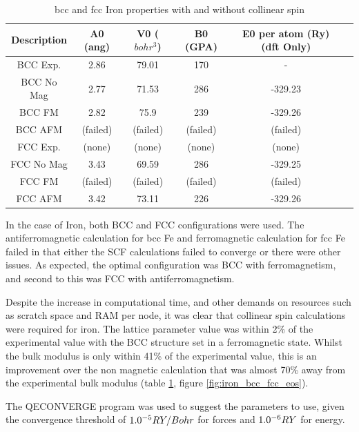 \begin{table}[h]
\begin{center}
\renewcommand{\arraystretch}{1.2}
\begin{tabular}{c c c c c c}
\hline\hline
Description & A0 (ang) & V0 ($bohr^3$) & B0 (GPA) & E0 per atom (Ry) (\acrshort{dft} Only) \\
\hline\hline
BCC Exp. & 2.86 & 79.01 & 170 & - \\
BCC No Mag & 2.77 & 71.53 & 286 & -329.23 \\
BCC FM & 2.82 & 75.9 & 239 & -329.26 \\
BCC AFM & (failed) & (failed) & (failed) & (failed) \\
FCC Exp. & (none) & (none) & (none) & (none) \\
FCC No Mag & 3.43 & 69.59 & 286 & -329.25 \\
FCC FM & (failed) & (failed) & (failed) & (failed) \\
FCC AFM & 3.42 & 73.11 & 226 & -329.26 \\
\hline\hline
\end{tabular}
\end{center}
\caption{\acrshort{bcc} and \acrshort{fcc} Iron properties with and without collinear spin}
\label{table:feproperties}
\end{table}

In the case of Iron, both BCC and FCC configurations were used.  The antiferromagnetic calculation for \acrshort{bcc} \Gls{Fe} and ferromagnetic calculation for \acrshort{fcc} \Gls{Fe} failed in that either the SCF calculations failed to converge or there were other issues.  As expected, the optimal configuration was BCC with ferromagnetism, and second to this was FCC with antiferromagnetism.

Despite the increase in computational time, and other demands on resources such as scratch space and RAM per node, it was clear that collinear spin calculations were required for iron.  The lattice parameter value was within 2\% of the experimental value with the BCC structure set in a ferromagnetic state.  Whilst the bulk modulus is only within 41\% of the experimental value, this is an improvement over the non magnetic calculation that was almost 70\% away from the experimental bulk modulus (table \ref{table:feproperties}, figure \ref{fig:iron_bcc_fcc_eos}).


The QECONVERGE program was used to suggest the parameters to use, given the convergence threshold of $1.0 \time 10^{-5} RY/Bohr$ for forces and $1.0 \time 10^{-6} RY$ for energy.

